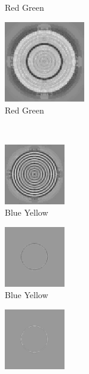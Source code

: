 \documentclass[journal,onecolumn]{IEEEtran}
\begin{document}
\begin{figure}[!htbp]
\begin{subfigure}[b]{0.25\textwidth}
            \caption{Red Green}
            \label{img:test-circle-neon-dwt-b-rg-mask}
    \end{subfigure}%
    \begin{subfigure}[b]{0.25\textwidth}
            \centering
            \includegraphics[width=100pt, frame]{test-circle-neon-dwt-b-rg}
            \caption{Red Green}
            \label{img:test-circle-neon-dwt-b-rg}
    \end{subfigure}\\
    \begin{subfigure}[b]{0.25\textwidth}
            \centering
            \includegraphics[width=100px, frame]{test-circle-neon-dwt-a-by}
            \caption{Blue Yellow}
            \label{img:test-circle-neon-dwt-b-by}
    \end{subfigure}%
    \begin{subfigure}[b]{0.25\textwidth}
            \centering
            \includegraphics[width=100px, frame]{test-circle-neon-dwt-a-by-mask}
            \caption{Blue Yellow}
            \label{img:test-circle-neon-dwt-b-by-mask}
    \end{subfigure}%
    \begin{subfigure}[b]{0.25\textwidth}
            \centering
            \includegraphics[width=100px, frame]{test-circle-neon-dwt-b-by-mask}

\end{subfigure}
\end{figure}
\end{document}
